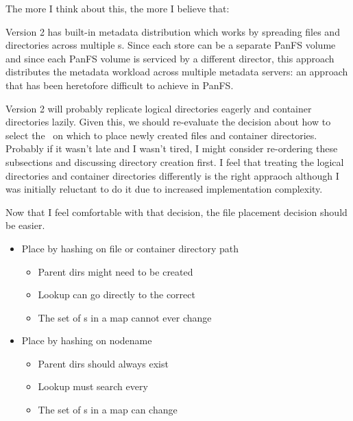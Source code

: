 \documentclass[10pt]{article}
\begin{document}
The more I think about this, the more I believe that:



Version 2 has built-in metadata distribution which works by spreading
files and directories across multiple {\store}s.  Since each store can
be a separate PanFS volume and since each PanFS volume is serviced by 
a different director, this approach distributes the metadata workload 
across multiple metadata servers: an approach that has been heretofore
difficult to achieve in PanFS.

Version 2 will probably replicate logical directories eagerly and
container directories lazily.  Given this, we should re-evaluate the
decision about how to select the \store\ on which to place newly created
files and container directories.  Probably if it wasn't late and I wasn't
tired, I might consider re-ordering these subsections and discussing 
directory creation first.  I feel that treating the logical directories and
container directories differently is the right appraoch although I was
initially reluctant to do it due to increased implementation complexity.

Now that I feel comfortable with that decision, the file placement decision
should be easier.  

\begin{itemize}
\item{Place by hashing on file or container directory path}
\begin{itemize}
\item{Parent dirs might need to be created}
\item{Lookup can go directly to the correct \store}
\item{The set of {\store}s in a map cannot ever change}
\end{itemize}
\item{Place by hashing on nodename}
\begin{itemize}
\item{Parent dirs should always exist}
\item{Lookup must search every \store}
\item{The set of {\store}s in a map can change}
\end{itemize}
\end{itemize}

\end{document}
